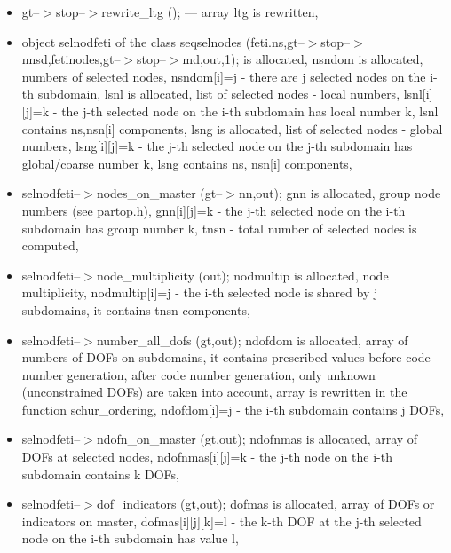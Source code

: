\begin{itemize}
\item
gt--$>$stop--$>$rewrite\_ltg (); --- array ltg is rewritten,

\item
object selnodfeti of the class seqselnodes (feti.ns,gt--$>$stop--$>$nnsd,fetinodes,gt--$>$stop--$>$md,out,1); is allocated,
\newline
nsndom is allocated,
numbers of selected nodes,
nsndom[i]=j - there are j selected nodes on the i-th subdomain,
\newline
lsnl is allocated,
list of selected nodes - local numbers,
lsnl[i][j]=k - the j-th selected node on the i-th subdomain has local number k,
lsnl contains ns,nsn[i] components,
\newline
lsng is allocated,
list of selected nodes - global numbers,
lsng[i][j]=k - the j-th selected node on the j-th subdomain has global/coarse number k,
lsng contains ns, nsn[i] components,


\item
selnodfeti--$>$nodes\_on\_master (gt--$>$nn,out);
\newline
gnn is allocated,
group node numbers (see partop.h),
gnn[i][j]=k - the j-th selected node on the i-th subdomain has group number k,
\newline
tnsn - total number of selected nodes is computed,

\item
selnodfeti--$>$node\_multiplicity (out);
\newline
nodmultip is allocated,
node multiplicity,
nodmultip[i]=j - the i-th selected node is shared by j subdomains,
it contains tnsn components,

\item
selnodfeti--$>$number\_all\_dofs (gt,out);
\newline
ndofdom is allocated,
array of numbers of DOFs on subdomains,
it contains prescribed values before code number generation,
after code number generation, only unknown (unconstrained DOFs) are taken into account,
array is rewritten in the function schur\_ordering,
ndofdom[i]=j - the i-th subdomain contains j DOFs,

\item
selnodfeti--$>$ndofn\_on\_master (gt,out);
\newline
ndofnmas is allocated,
array of DOFs at selected nodes,
ndofnmas[i][j]=k - the j-th node on the i-th subdomain contains k DOFs,

\item
selnodfeti--$>$dof\_indicators (gt,out);
\newline
dofmas is allocated,
array of DOFs or indicators on master,
dofmas[i][j][k]=l - the k-th DOF at the j-th selected node on the i-th subdomain has value l,



\end{itemize}
